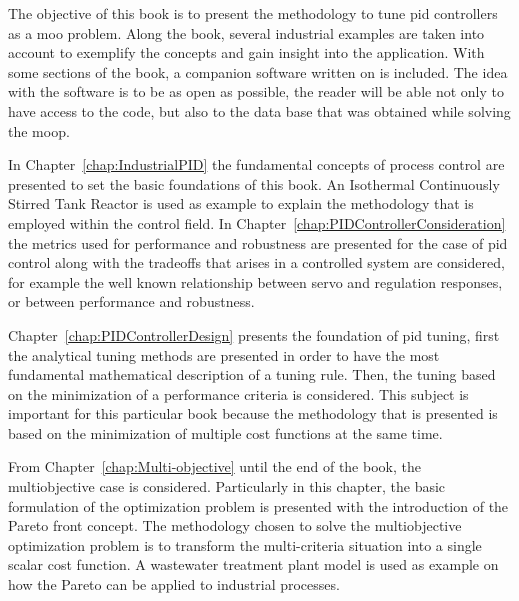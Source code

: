 The objective of this book is to present the methodology to tune \gls{pid} controllers as a \gls{moo} problem. Along the book, several industrial examples are taken into account to exemplify the concepts and gain insight into the application. With some sections of the book, a companion software written on \matlab is included. The idea with the software is to be as open as possible, the reader will be able not only to have access to the code, but also to the data base that was obtained while solving the \gls{moop}.

In Chapter~\ref{chap:IndustrialPID} the fundamental concepts of process control are presented to set the basic foundations of this book. An Isothermal Continuously Stirred Tank Reactor is used as example to explain the methodology that is employed within the control field. In Chapter~\ref{chap:PIDControllerConsideration} the metrics used for performance and robustness are presented for the case of \gls{pid} control along with the tradeoffs that arises in a controlled system are considered, for example the well known relationship between servo and regulation responses, or between performance and robustness.

Chapter~\ref{chap:PIDControllerDesign} presents the foundation of \gls{pid} tuning, first the analytical tuning methods are presented in order to have the most fundamental mathematical description of a tuning rule. Then, the tuning based on the minimization of a performance criteria is considered. This subject is important for this particular book because the methodology that is presented is based on the minimization of multiple cost functions at the same time.

From Chapter~\ref{chap:Multi-objective} until the end of the book, the multiobjective case is considered. Particularly in this chapter, the basic formulation of the optimization problem is presented with the introduction of the Pareto front concept. The methodology chosen to solve the multiobjective optimization problem is to transform the multi-criteria situation into a single scalar cost function. A wastewater treatment plant model is used as example on how the Pareto can be applied to industrial processes.

